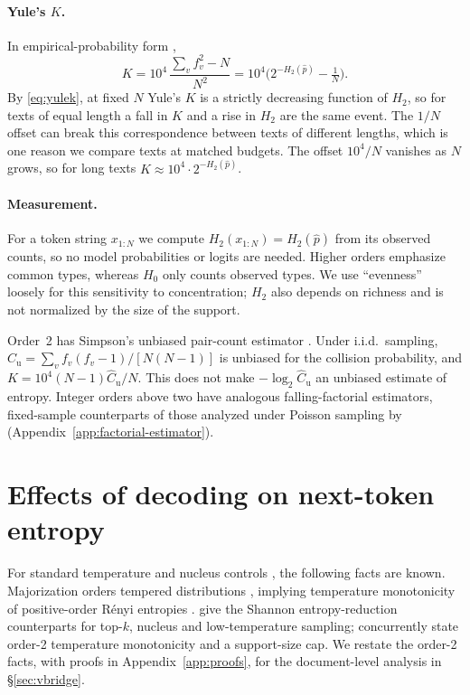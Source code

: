 \documentclass[10pt]{article}
\theoremstyle{plain}
\theoremstyle{definition}
\newcommand{\ph}{\hat p}
\newcommand{\Htwo}{H_2}
\newcommand{\Hz}{H_0}
\begin{document}
\paragraph{Yule's $K$.} In empirical-probability form \citep{yule1944},
\begin{equation}
K = 10^4\,\frac{\sum_v f_v^2 - N}{N^2}
 = 10^4\Big(2^{-\Htwo(\ph)}-\tfrac1N\Big).
\label{eq:yulek}
\end{equation}
By \eqref{eq:yulek}, at fixed $N$ Yule's $K$ is a strictly decreasing function of $\Htwo$, so
for texts of equal length a fall in $K$ and a rise in $\Htwo$ are the same event. The $1/N$
offset can break this correspondence between texts of different lengths, which is one reason we
compare texts at matched budgets. The offset $10^4/N$ vanishes as $N$ grows, so for long texts
$K\approx10^4\cdot2^{-\Htwo(\ph)}$.

\paragraph{Measurement.} For a token string $x_{1:N}$ we compute $\Htwo(x_{1:N})=\Htwo(\ph)$
from its observed counts, so no model probabilities or logits are needed. Higher orders
emphasize common types, whereas $\Hz$ only counts observed types. We use ``evenness'' loosely
for this sensitivity to concentration; $\Htwo$ also depends on richness and is not normalized
by the size of the support.

Order~2 has Simpson's unbiased pair-count estimator \citep{simpson1949}. Under i.i.d.\ sampling,
$\widehat C_{\mathrm u}=\sum_v f_v(f_v-1)/[N(N-1)]$ is unbiased for the collision probability,
and $K=10^4(N-1)\widehat C_{\mathrm u}/N$. This does not make $-\log_2\widehat C_{\mathrm u}$
an unbiased estimate of entropy. Integer orders above two have analogous falling-factorial
estimators, fixed-sample counterparts of those analyzed under Poisson sampling by
\citet{acharya2017renyi}
(Appendix~\ref{app:factorial-estimator}).

\section{Effects of decoding on next-token entropy}
\label{sec:pertoken}

For standard temperature and nucleus controls \citep{holtzman2020}, the following facts
are known. Majorization orders tempered distributions \citep{marshall2011inequalities},
implying temperature monotonicity of positive-order R\'enyi entropies
\citep{mattei2026welltempered}. \citet{nadeem2020systematic} give the Shannon entropy-reduction
counterparts for top-$k$, nucleus and low-temperature sampling;
\citet[App.~J]{skobelev2026finetuning} concurrently state order-2 temperature monotonicity
and a support-size cap. We restate the order-2 facts, with proofs in Appendix~\ref{app:proofs},
for the document-level analysis in \S\ref{sec:vbridge}.
\end{document}
